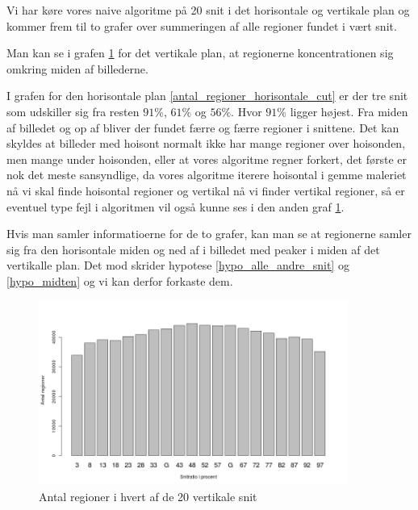 Vi har køre vores naive algoritme på 20 snit i det horisontale og
vertikale plan og kommer frem til to grafer over summeringen af alle
regioner fundet i vært snit. 

Man kan se i grafen \ref{antal_regioner_vertikale_cut} for det vertikale
plan, at regionerne koncentrationen sig omkring miden af billederne.

I grafen for den horisontale plan \ref{antal_regioner_horisontale_cut}
er der tre snit som udskiller sig fra resten $91\%$, $61\%$ og $56\%$.
Hvor $91\%$ ligger højest. Fra miden af billedet og op af bliver der
fundet færre og færre regioner i snittene. Det kan skyldes at billeder med
hoisont normalt ikke har mange regioner over hoisonden, men mange under
hoisonden, eller at vores algoritme regner forkert, det første er nok det meste
sansyndlige, da vores algoritme iterere hoisontal i gemme maleriet nå vi skal
finde hoisontal regioner og vertikal nå vi finder vertikal regioner, så er
eventuel type fejl i algoritmen vil også kunne ses i den anden graf
\ref{antal_regioner_vertikale_cut}.

Hvis man samler informatioerne for de to grafer, kan man se at regionerne
samler sig fra den horisontale miden og ned af i billedet med peaker i
miden af det vertikalle plan. Det mod skrider hypotese \ref{hypo_alle_andre_snit} og \ref{hypo_midten}
og vi kan derfor forkaste dem.

\begin{figure}[h!]
	\begin{center}
		\includegraphics[width=0.9\textwidth]{afsnit/resultater/billeder/cut0cut1eatsperratio.png}
	\end{center}
	\caption{Antal regioner i hvert af de 20 vertikale snit}
	\label{antal_regioner_vertikale_cut}
\end{figure}

